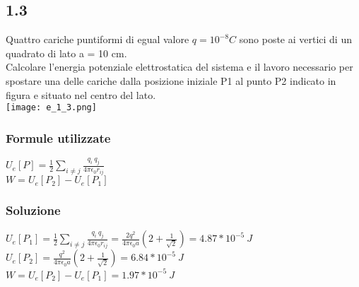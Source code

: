 \documentclass[../../main.tex]{subfiles}
\begin{document}
\subsection*{1.3}
Quattro cariche puntiformi di egual valore $q = 10^{-8}C$ sono poste ai vertici di un quadrato di lato a = 10 cm. 
\\Calcolare l’energia potenziale elettrostatica del sistema e il lavoro necessario per spostare una delle cariche dalla posizione iniziale P1 al punto P2 indicato in figura e situato nel centro del lato.
\\\texttt{[image: e\_1\_3.png]}
\subsubsection*{Formule utilizzate}
$U_e[P] = \frac{1}{2}\sum_{i \ne j}\frac{q_i\ q_j}{4\pi \epsilon_0 r_{ij}}$
\\$W = U_e[P_2] - U_e[P_1]$
\subsubsection*{Soluzione}
$U_e[P_1] = \frac{1}{2}\sum_{i \ne j}\frac{q_i\ q_j}{4\pi \epsilon_0 r_{ij}} = \frac{2q^2}{4\pi\epsilon_0a}\left(2 + \frac{1}{\sqrt{2}}\right) = 4.87 * 10^{-5}\ J $
\\$U_e[P_2] = \frac{q^2}{4\pi\epsilon_0a} \left(2+ \frac{1}{\sqrt{2}}\right) = 6.84 * 10^{-5}\ J$
\\$W = U_e[P_2] - U_e[P_1] = 1.97 * 10^{-5}\ J $
\newpage
\end{document}
